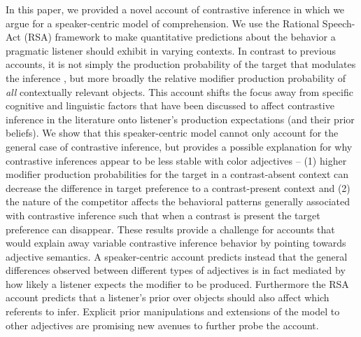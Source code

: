 \documentclass[10pt,letterpaper]{article}
\begin{document}
In this paper, we provided a novel account of contrastive inference in which we argue for a speaker-centric model of comprehension. We use the Rational Speech-Act (RSA) framework to make quantitative predictions about the behavior a pragmatic listener should exhibit in varying contexts. In contrast to previous accounts, it is not simply the production probability of the target that modulates the inference \cite<as suggested by the default description account>{Sedivy:2003}, but more broadly the relative modifier production probability of \emph{all} contextually relevant objects. This account shifts the focus away from specific cognitive and linguistic factors that have been discussed to affect contrastive inference in the literature onto listener's production expectations (and their prior beliefs). We show that this speaker-centric model cannot only account for the general case of contrastive inference, but provides a possible explanation for why contrastive inferences appear to be less stable with color adjectives -- (1) higher modifier production probabilities for the target in a contrast-absent context can decrease the difference in target preference to a contrast-present context and (2) the nature of the competitor affects the behavioral patterns generally associated with contrastive inference such that when a contrast is present the target preference can disappear. These results provide a challenge for accounts that would explain away variable contrastive inference behavior by pointing towards adjective semantics. A speaker-centric account predicts instead that the general differences observed between different types of adjectives is in fact mediated by how likely a listener expects the modifier to be produced. Furthermore the RSA account predicts that a listener's prior over objects should also affect which referents to infer. Explicit prior manipulations and extensions of the model to other adjectives are promising new avenues to further probe the account.
\end{document}
